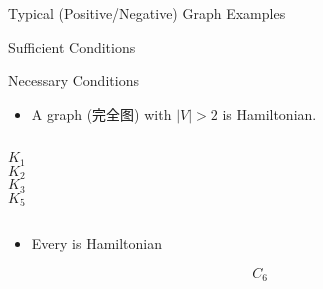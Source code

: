 \begin{frame}{}
  \begin{center}
    Typical (Positive/Negative) Graph Examples

    \vspace{0.80cm}
    Sufficient Conditions

    \vspace{0.80cm}
    Necessary Conditions
  \end{center}
\end{frame}

\begin{frame}{}
  \begin{exampleblock}{}
    \begin{itemize}
      \item A  graph (完全图) with $|V| > 2$ is Hamiltonian.
    \end{itemize}
  \end{exampleblock}

  \pause
  \vspace{0.60cm}
  \begin{columns}
      \[
        K_{1}
      \]
      \[
        K_{2}
      \]
      \[
        K_{3}
      \]
      \[
        K_{5}
      \]
  \end{columns}
\end{frame}

\begin{frame}{}
  \begin{exampleblock}{}
    \begin{itemize}
      \item Every  is Hamiltonian
    \end{itemize}
  \end{exampleblock}

  \vspace{0.60cm}
  \[
    C_{6}
  \]
\end{frame}

